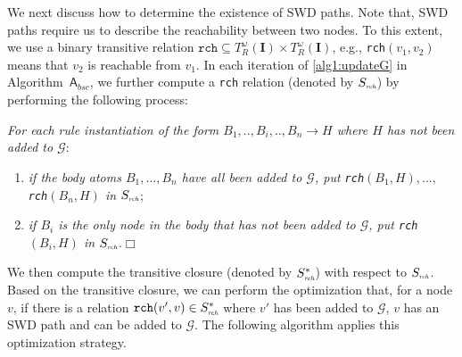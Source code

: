 \documentclass[final,1p,times]{elsarticle}
\begin{document}
We next discuss how to determine the existence of SWD paths. Note that, SWD paths require us to
describe the reachability between two nodes. To this extent, we use a
binary transitive relation $\texttt{rch} \subseteq T_R^{\omega}(\textbf{I})\times T_R^{\omega}(\textbf{I})$,
e.g., \texttt{rch}$(v_1,v_2)$ means that $v_2$ is reachable from $v_1$.
In each iteration of \ref{alg1:updateG} in Algorithm~$\mathsf{A}_{bsc}$, we further compute a \texttt{rch}
relation (denoted by $S_{\textit{\tiny rch}}$) by performing the following process:

\begin{description}[leftmargin=2ex]
\item[(\textbf{\dag})] \emph{For each rule instantiation of the form $B_1,..,B_i,..,B_n\rightarrow H$
where $H$ has not been added to $\mathcal{G}$}:
\begin{enumerate}[leftmargin=2ex]
\item \emph{if the body atoms $B_1,...,B_n$ have all been added to $\mathcal{G}$, put \texttt{rch}$(B_1,H),...,$ \texttt{rch}$(B_n,H)$ in $S_{\textit{\tiny rch}}$};
\item \emph{if $B_i$ is the only node in the body that has not been added to $\mathcal{G}$,
    put \texttt{rch}$(B_i,H)$ in $S_{\textit{\tiny rch}}$}.\hfill$\Box$
\end{enumerate}
\end{description}

We then compute the transitive closure (denoted by $S^*_{\textit{\tiny rch}}$) with respect to
$S_{\textit{\tiny rch}}$. Based on the transitive closure, we can perform the optimization that,
for a node $v$, if there is a relation $\texttt{rch}(v',v)\in S^*_{\textit{\tiny rch}}$
where $v'$ has been added to $\mathcal{G}$, $v$ has an SWD path and can be added to $\mathcal{G}$.
The following algorithm applies this optimization strategy.\\
\end{document}

